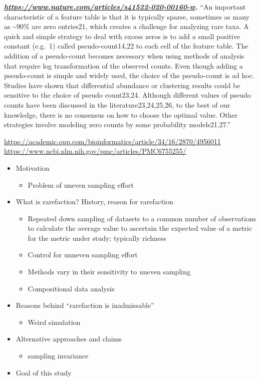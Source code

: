 \documentclass[
]{article}
\providecommand{\tightlist}{%
  \setlength{\itemsep}{0pt}\setlength{\parskip}{0pt}}
\begin{document}
\textbf{\emph{\url{https://www.nature.com/articles/s41522-020-00160-w}.}}
``An important characteristic of a feature table is that it is typically
sparse, sometimes as many as \textasciitilde90\% are zero entries21,
which creates a challenge for analyzing rare taxa. A quick and simple
strategy to deal with excess zeros is to add a small positive constant
(e.g.~1) called pseudo-count14,22 to each cell of the feature table. The
addition of a pseudo-count becomes necessary when using methods of
analysis that require log transformation of the observed counts. Even
though adding a pseudo-count is simple and widely used, the choice of
the pseudo-count is ad hoc. Studies have shown that differential
abundance or clustering results could be sensitive to the choice of
pseudo count23,24. Although different values of pseudo counts have been
discussed in the literature23,24,25,26, to the best of our knowledge,
there is no consensus on how to choose the optimal value. Other
strategies involve modeling zero counts by some probability
models21,27.''

\url{https://academic.oup.com/bioinformatics/article/34/16/2870/4956011}
\url{https://www.ncbi.nlm.nih.gov/pmc/articles/PMC6755255/}

\begin{itemize}
\tightlist
\item
  Motivation

  \begin{itemize}
  \tightlist
  \item
    Problem of uneven sampling effort
  \end{itemize}
\item
  What is rarefaction? History, reason for rarefaction

  \begin{itemize}
  \tightlist
  \item
    Repeated down sampling of datasets to a common number of
    observations to calculate the average value to ascertain the
    expected value of a metric for the metric under study; typically
    richness
  \item
    Control for unneven sampling effort
  \item
    Methods vary in their sensitivity to uneven sampling
  \item
    Compositional data analysis
  \end{itemize}
\item
  Reasons behind ``rarefaction is inadmissable''

  \begin{itemize}
  \tightlist
  \item
    Weird simulation
  \end{itemize}
\item
  Alternative approaches and claims

  \begin{itemize}
  \tightlist
  \item
    sampling invariance
  \end{itemize}
\item
  Goal of this study
\end{itemize}
\end{document}
